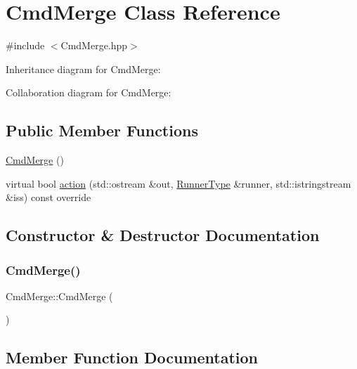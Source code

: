 \hypertarget{classCmdMerge}{}\section{Cmd\+Merge Class Reference}
\label{classCmdMerge}


{\ttfamily \#include $<$Cmd\+Merge.\+hpp$>$}



Inheritance diagram for Cmd\+Merge\+:


Collaboration diagram for Cmd\+Merge\+:
\subsection*{Public Member Functions}
\begin{DoxyCompactItemize}
\item 
\hyperlink{classCmdMerge_a3cd75f18eb4269030793dee47d24a983}{Cmd\+Merge} ()
\item 
virtual bool \hyperlink{classCmdMerge_a426f4d5c54b67471fff531adb8010fb8}{action} (std\+::ostream \&out, \hyperlink{Command_8hpp_ad45c3de597c2023a8be0399d914161f4}{Runner\+Type} \&runner, std\+::istringstream \&iss) const override
\end{DoxyCompactItemize}


\subsection{Constructor \& Destructor Documentation}
\mbox{\label{classCmdMerge_a3cd75f18eb4269030793dee47d24a983}} 
\subsubsection{\texorpdfstring{Cmd\+Merge()}{CmdMerge()}}
{\footnotesize\ttfamily Cmd\+Merge\+::\+Cmd\+Merge (\begin{DoxyParamCaption}{ }\end{DoxyParamCaption})}



\subsection{Member Function Documentation}
\mbox{\label{classCmdMerge_a426f4d5c54b67471fff531adb8010fb8}} 
